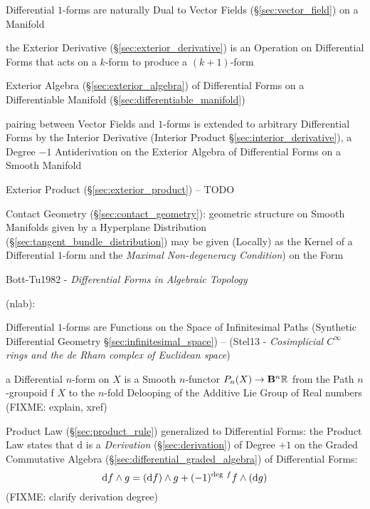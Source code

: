 Differential $1$-forms are naturally Dual to Vector Fields
(\S\ref{sec:vector_field}) on a Manifold

the Exterior Derivative (\S\ref{sec:exterior_derivative}) is an Operation on
Differential Forms that acts on a $k$-form to produce a $(k+1)$-form

Exterior Algebra (\S\ref{sec:exterior_algebra}) of Differential Forms on a
Differentiable Manifold (\S\ref{sec:differentiable_manifold})

pairing between Vector Fields and $1$-forms is extended to arbitrary
Differential Forms by the Interior Derivative (Interior Product
\S\ref{sec:interior_derivative}), a Degree $-1$ Antiderivation on the Exterior
Algebra of Differential Forms on a Smooth Manifold

Exterior Product (\S\ref{sec:exterior_product}) -- TODO

\fist Contact Geometry (\S\ref{sec:contact_geometry}): geometric structure on
Smooth Manifolds given by a Hyperplane Distribution
(\S\ref{sec:tangent_bundle_distribution}) may be given (Locally) as the Kernel
of a Differential $1$-form and the \emph{Maximal Non-degeneracy Condition}) on
the Form

Bott-Tu1982 - \emph{Differential Forms in Algebraic Topology}

(nlab):

Differential $1$-forms are Functions on the Space of Infinitesimal Paths
(Synthetic Differential Geometry \S\ref{sec:infinitesimal_space}) -- (Stel13 -
\emph{Cosimplicial $C^\infty$ rings and the de Rham complex of Euclidean space})

a Differential $n$-form on $X$ is a Smooth $n$-functor $P_n(X) \rightarrow
\mathbf{B}^n\mathbb{R}$ from the Path $n$-groupoid f $X$ to the $n$-fold Delooping
of the Additive Lie Group of Real numbers (FIXME: explain, xref)

Product Law (\S\ref{sec:product_rule}) generalized to Differential Forms: the
Product Law states that $\mathrm{d}$ is a \emph{Derivation}
(\S\ref{sec:derivation}) of Degree $+1$ on the Graded Commutative Algebra
(\S\ref{sec:differential_graded_algebra}) of Differential Forms:
\[
\mathrm{d}f \wedge g = (\mathrm{d}f) \wedge g +
  (-1)^{\mathrm{deg}\ f}f \wedge (\mathrm{d}g)
\]
(FIXME: clarify derivation degree)

\asterism

